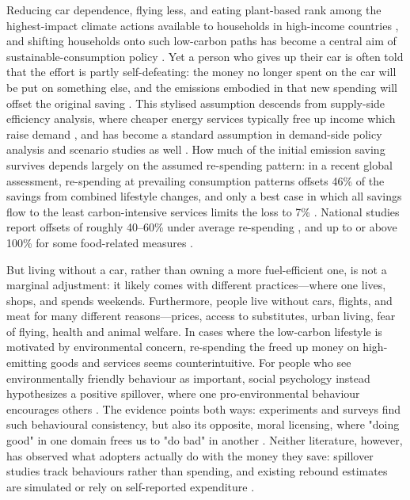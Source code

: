 \documentclass[sn-nature]{sn-jnl}
\begin{document}
\maketitle
\linenumbers
Reducing car dependence, flying less, and eating plant-based rank among the highest-impact climate actions available to households in high-income countries \citep{IPCC_AR6_WG3_2022,Creutzig2022,Wynes2017}, and shifting households onto such low-carbon paths has become a central aim of sustainable-consumption policy \citep{Creutzig2022}. Yet a person who gives up their car is often told that the effort is partly self-defeating: the money no longer spent on the car will be put on something else, and the emissions embodied in that new spending will offset the original saving \citep{hubacek2011net,Berkhout2000,SorrellDimitropoulos2008,Hertwich2005,sorrell2020,Reimers2022}. This stylised assumption descends from supply-side efficiency analysis, where cheaper energy services typically free up income which raise demand \citep{SorrellDimitropoulos2008}, and has become a standard assumption in demand-side policy analysis and scenario studies as well \citep{Chitnis2013,Bjelle2018,Niamir2020}. How much of the initial emission saving survives depends largely on the assumed re-spending pattern: in a recent global assessment, re-spending at prevailing consumption patterns offsets 46\% of the savings from combined lifestyle changes, and only a best case in which all savings flow to the least carbon-intensive services limits the loss to 7\% \citep{guan2025unlocking}. National studies report offsets of roughly 40--60\% under average re-spending \citep{ChitnisSorrell2015,Bjelle2018}, and up to or above 100\% for some food-related measures \citep{Chitnis2014}. 

But living without a car, rather than owning a more fuel-efficient one, is not a marginal adjustment: it likely comes with different practices---where one lives, shops, and spends weekends. Furthermore, people live without cars, flights, and meat for many different reasons---prices, access to substitutes, urban living, fear of flying, health and animal welfare. In cases where the low-carbon lifestyle is motivated by environmental concern, re-spending the freed up money on high-emitting goods and services seems counterintuitive. For people who see environmentally friendly behaviour as important, social psychology instead hypothesizes a positive spillover, where one pro-environmental behaviour encourages others \citep{WhitmarshONeill2010,udall2021}. The evidence points both ways: experiments and surveys find such behavioural consistency, but also its opposite, moral licensing, where "doing good" in one domain frees us to "do bad" in another \citep{Truelove2014,thogersen1999spillover,Merritt2010,Blanken2015,Nilsson2017}. Neither literature, however, has observed what adopters actually do with the money they save: spillover studies track behaviours rather than spending, and existing rebound estimates are simulated or rely on self-reported expenditure \citep{ottelin2024rebound,olson2024nordic}.
\end{document}
